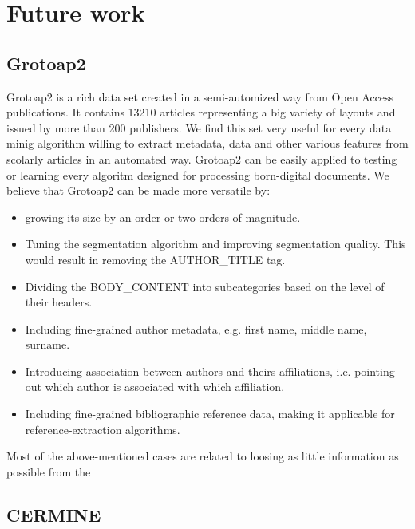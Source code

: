 \section{Future work}
\subsection{Grotoap2}
Grotoap2 is a rich data set created in a semi-automized way from Open Access publications. It contains 13210 articles representing a big variety of layouts and issued by more than 200 publishers. We find this set very useful for every data minig algorithm willing to extract metadata, data and other various features from scolarly articles in an automated way. Grotoap2 can be easily applied to testing or learning every algoritm designed for processing born-digital documents.
\quad
We believe that Grotoap2 can be made more versatile by:
\begin{itemize}
\item growing its size by an order or two orders of magnitude.
\item Tuning the segmentation algorithm and improving segmentation quality. This would result in removing the AUTHOR\_TITLE tag.
\item Dividing the BODY\_CONTENT into subcategories based on the level of their headers.
\item Including fine-grained author metadata, e.g. first name, middle name, surname.
\item Introducing association between authors and theirs affiliations, i.e. pointing out which author is associated with which affiliation.
\item Including fine-grained bibliographic reference data, making it applicable for reference-extraction algorithms.
\end{itemize}
Most of the above-mentioned cases are related to loosing as little information as possible from the

\subsection{CERMINE}